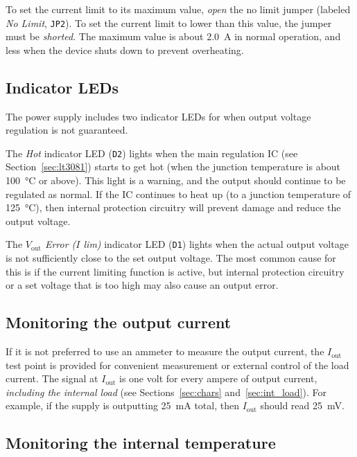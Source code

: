 \documentclass[letterpaper,twocolumn,11pt]{article}
\newcommand{\refdes}[1]{\texttt{#1}}
\begin{document}
To set the current limit to its maximum value, \emph{open} the no limit jumper
(labeled \emph{No Limit}, \refdes{JP2}). To set the current limit to lower than
this value, the jumper must be \emph{shorted}. The maximum value is about
\SI{2.0}{\A} in normal operation, and less when the device shuts down to prevent
overheating.

\subsection{Indicator LEDs}

The power supply includes two indicator LEDs for when output voltage regulation
is not guaranteed.

The \textit{Hot} indicator LED (\refdes{D2}) lights when the main regulation IC
(see Section~\ref{sec:lt3081}) starts to get hot (when the junction temperature
is about \SI{100}{\celsius} or above). This light is a warning, and the output
should continue to be regulated as normal. If the IC continues to heat up (to a
junction temperature of \SI{125}{\celsius}), then internal protection circuitry
will prevent damage and reduce the output voltage.

The \textit{$V_\text{out}$ Error ($I$ lim)} indicator LED (\refdes{D1}) lights
when the actual output voltage is not sufficiently close to the set output
voltage. The most common cause for this is if the current limiting function is
active, but internal protection circuitry or a set voltage that is too high may
also cause an output error.

\subsection{Monitoring the output current}

If it is not preferred to use an ammeter to measure the output current, the
\textit{$I_\text{out}$} test point is provided for convenient measurement or
external control of the load current. The signal at \textit{$I_\text{out}$}
is one volt for every ampere of output current, \emph{including the internal
load} (see Sections~\ref{sec:chars} and~\ref{sec:int_load}). For example, if the
supply is outputting \SI{25}{\mA} total, then \textit{$I_\text{out}$} should
read \SI{25}{\mV}.

\subsection{Monitoring the internal temperature}
\end{document}
